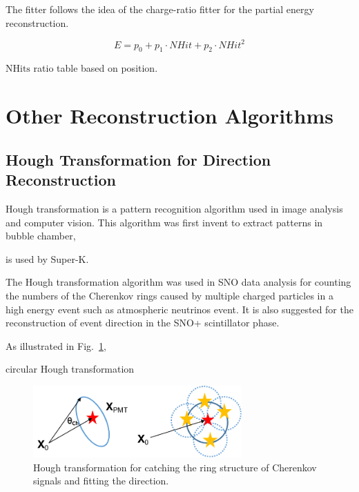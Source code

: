 The fitter follows the idea of the charge-ratio fitter for the partial energy reconstruction\cite{partialEnergyYang}.

\begin{equation}
E = p_0+p_1\cdot NHit+p_2\cdot NHit^2
\end{equation}


$\mathrm{NHits}$ ratio table based on position.


\section{Other Reconstruction Algorithms}
\subsection{Hough Transformation for Direction Reconstruction}

Hough transformation is a pattern recognition algorithm used in image analysis and computer vision\cite{davies1997machine}. This algorithm was first invent to extract patterns in bubble chamber\cite{houghwiki}, 

is used by Super-K\cite{shiozawa1999reconstruction}.

The Hough transformation algorithm was used in SNO data analysis for counting the numbers of the Cherenkov rings caused by multiple charged particles in a high energy event such as atmospheric neutrinos event\cite{bonventre2014neutron}. It is also suggested for the reconstruction of event direction in the SNO+ scintillator phase\cite{houghTransform}.

As illustrated in Fig.~\ref{houghTrans}, 

circular Hough transformation
\begin{figure}[!htb]
	\centering
	\includegraphics[width=8cm]{houghTransform.png}
	\caption{Hough transformation for catching the ring structure of Cherenkov signals and fitting the direction.}
	\label{houghTrans}
\end{figure}

